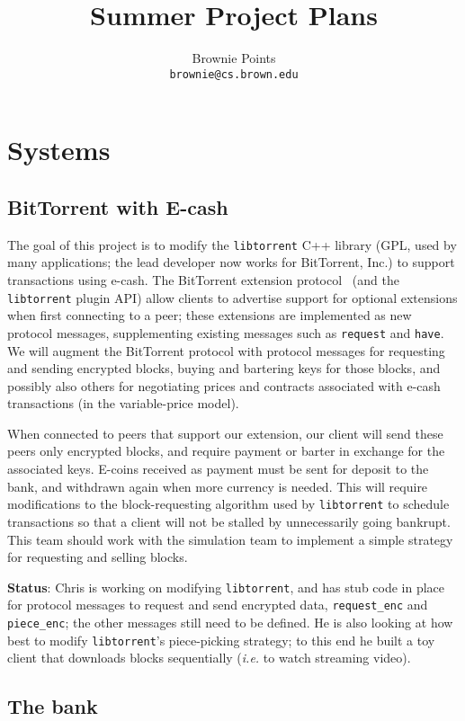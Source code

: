 \documentclass[11pt]{article}
\title{Summer Project Plans}
\date{}
\author{
Brownie Points\\
{\normalsize\tt brownie@cs.brown.edu}\\
}
\begin{document}
\maketitle

\section{Systems}

\subsection{BitTorrent with E-cash}

The goal of this project is to modify the {\tt libtorrent} C++ library (GPL, used by many applications; the lead developer now works for BitTorrent, Inc.) to support transactions using e-cash.  The BitTorrent extension protocol~\cite{BEP10} (and the {\tt libtorrent} plugin API) allow clients to advertise support for optional extensions when first connecting to a peer; these extensions are implemented as new protocol messages, supplementing existing messages such as {\tt request} and {\tt have}.  We will augment the BitTorrent protocol with protocol messages for requesting and sending encrypted blocks, buying and bartering keys for those blocks, and possibly also others for negotiating prices and contracts associated with e-cash transactions (in the variable-price model).

When connected to peers that support our extension, our client will send these peers only encrypted blocks, and require payment or barter in exchange for the associated keys.  E-coins received as payment must be sent for deposit to the bank, and withdrawn again when more currency is needed.  This will require modifications to the block-requesting algorithm used by {\tt libtorrent} to schedule transactions so that a client will not be stalled by unnecessarily going bankrupt.  This team should work with the simulation team to implement a simple strategy for requesting and selling blocks.

{\bf Status}: Chris is working on modifying {\tt libtorrent}, and has stub code in place for protocol messages to request and send encrypted data, {\tt request\_enc} and {\tt piece\_enc}; the other messages still need to be defined.  He is also looking at how best to modify {\tt libtorrent}'s piece-picking strategy; to this end he built a toy client that downloads blocks sequentially (\emph{i.e.} to watch streaming video).

\subsection{The bank}
\end{document}
